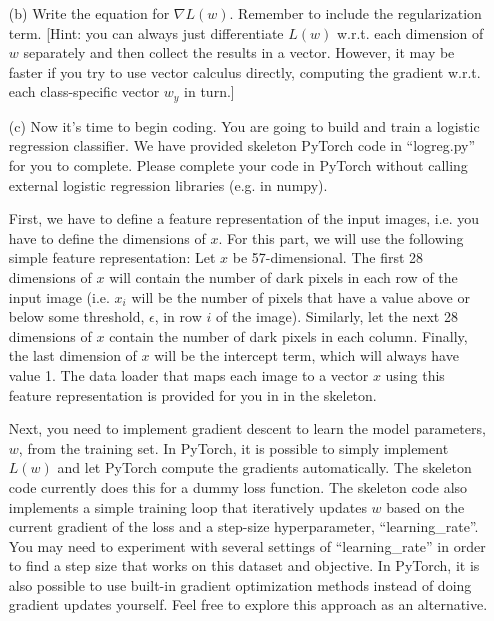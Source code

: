\documentclass[10pt]{report}
\begin{document}
\begin{enumerate}
\begin{enumerate}
\begin{solution}
\end{solution}

\vspace{1em}

\item[(b)] Write the equation for $\nabla L(w)$. Remember to include the regularization term. [Hint: you can always just differentiate $L(w)$ w.r.t. each dimension of $w$ separately and then collect the results in a vector. However, it may be faster if you try to use vector calculus directly, computing the gradient w.r.t. each class-specific vector $w_y$ in turn.]
\begin{solution}

\end{solution}

\vspace{1em}

\item[(c)] Now it's time to begin coding. You are going to build and train a logistic regression classifier. We have provided skeleton PyTorch code in ``logreg.py'' for you to complete. Please complete your code in PyTorch without calling external logistic regression libraries (e.g. in numpy).

\vspace{0.5em}
First, we have to define a feature representation of the input images, i.e. you have to define the dimensions of $x$. For this part, we will use the following simple feature representation: Let $x$ be 57-dimensional. The first 28 dimensions of $x$ will contain the number of dark pixels in each row of the input image (i.e. $x_i$ will be the number of pixels that have a value above or below some threshold, $\epsilon$, in row $i$ of the image). Similarly, let the next 28 dimensions of $x$ contain the number of dark pixels in each column. Finally, the last dimension of $x$ will be the intercept term, which will always have value 1. The data loader that maps each image to a vector $x$ using this feature representation is provided for you in in the skeleton. 
 
\vspace{0.5em}
Next, you need to implement gradient descent to learn the model parameters, $w$, from the training set. In PyTorch, it is possible to simply implement $L(w)$ and let PyTorch compute the gradients automatically. The skeleton code currently does this for a dummy loss function. The skeleton code also implements a simple training loop that iteratively updates $w$ based on the current gradient of the loss and a step-size hyperparameter, ``learning\_rate''. You may need to experiment with several settings of ``learning\_rate'' in order to find a step size that works on this dataset and objective. In PyTorch, it is also possible to use built-in gradient optimization methods instead of doing gradient updates yourself. Feel free to explore this approach as an alternative.  


\end{enumerate}
\end{enumerate}
\end{document}
